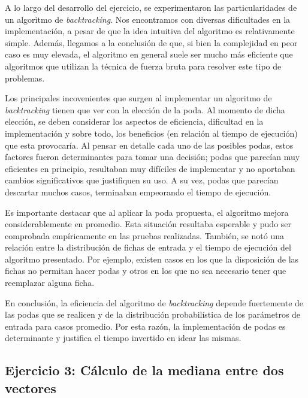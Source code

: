 \documentclass[a4paper,10pt] {article}
\begin{document}
A lo largo del desarrollo del ejercicio, se experimentaron las particularidades de un algoritmo de \textit{backtracking}. Nos encontramos con diversas dificultades en la implementaci\'on, a pesar de que la idea intuitiva del algoritmo es relativamente simple. Adem\'as, llegamos a la conclusi\'on de que, si bien la complejidad en peor caso es muy elevada, el algoritmo en general suele ser mucho m\'as eficiente que algoritmos que utilizan la t\'ecnica de fuerza bruta para resolver este tipo de problemas. 

Los principales incovenientes que surgen al implementar un algoritmo de \textit{backtracking} tienen que ver con la elecci\'on de la poda. Al momento de dicha elecci\'on, se deben considerar los aspectos de eficiencia, dificultad en la implementaci\'on y sobre todo, los beneficios (en relaci\'on al tiempo de ejecuci\'on) que esta provocar\'ia. Al pensar en detalle cada uno de las posibles podas, estos factores fueron determinantes para tomar una decisi\'on; podas que parec\'ian muy eficientes en principio, resultaban muy dif\'iciles de implementar y no aportaban cambios significativos que justifiquen su uso. A su vez, podas que parec\'ian descartar muchos casos, terminaban empeorando el tiempo de ejecuci\'on.

Es importante destacar que al aplicar la poda propuesta, el algoritmo mejora considerablemente en promedio. Esta situaci\'on resultaba esperable y pudo ser comprobada emp\'iricamente en las pruebas realizadas. Tambi\'en, se not\'o una relaci\'on entre la distribuci\'on de fichas de entrada y el tiempo de ejecuci\'on del algoritmo presentado. Por ejemplo, existen casos en los que la disposici\'on de las fichas no permitan hacer podas y otros en los que no sea necesario tener que reemplazar alguna ficha.

En conclusi\'on, la eficiencia del algoritmo de \textit{backtracking} depende fuertemente de las podas que se realicen y de la distribuci\'on probabil\'istica de los par\'ametros de entrada para casos promedio. Por esta raz\'on, la implementaci\'on de podas es determinante y justifica el tiempo invertido en idear las mismas.

\begin{center}
\section*{Ejercicio 3: C\'alculo de la mediana entre dos vectores}
\end{center}
\end{document}
